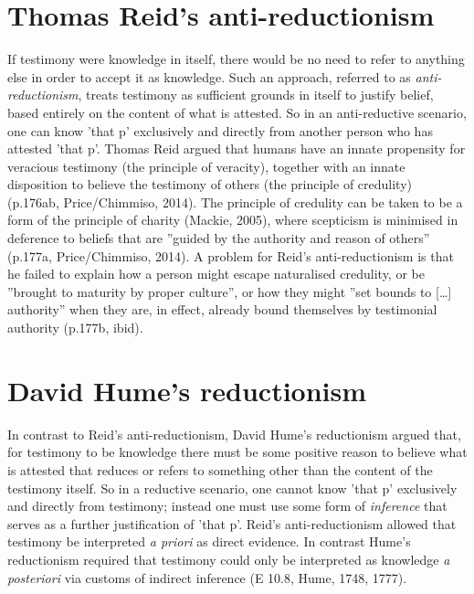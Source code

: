\documentclass[a4paper, 11pt]{article} %
\begin{document}

\section*{Thomas Reid's anti-reductionism}

If testimony were knowledge in itself, there would be no need to refer to anything else in order to accept it as knowledge. Such an approach, referred to as \textit{anti-reductionism}, treats testimony as sufficient grounds in itself to justify belief, based entirely on the content of what is attested. So in an anti-reductive scenario, one can know 'that p' exclusively and directly from another person who has attested 'that p'. Thomas Reid argued that humans have an innate propensity for veracious testimony (the principle of veracity), together with an innate disposition to believe the testimony of others (the principle of credulity) (p.176ab, Price/Chimmiso, 2014)\cite{Price/Chismisso:2014}. The principle of credulity can be taken to be a form of the principle of charity (Mackie, 2005)\cite{Mackie:2005}, where scepticism is minimised in deference to beliefs that are ''guided by the authority and reason of others'' (p.177a, Price/Chimmiso, 2014)\cite{Price/Chismisso:2014}. A problem for Reid's anti-reductionism is that he failed to explain how a person might escape naturalised credulity, or be ''brought to maturity by proper culture'', or how they might ''set bounds to [\dots] authority'' when they are, in effect, already bound themselves by testimonial authority (p.177b, ibid)\cite{Price/Chismisso:2014}.


\section*{David Hume's reductionism}

In contrast to Reid's anti-reductionism, David Hume's reductionism argued that, for testimony to be knowledge there must be some positive reason to believe what is attested that reduces or refers to something other than the content of the testimony itself. So in a reductive scenario, one cannot know 'that p' exclusively and directly from testimony; instead one must use some form of \textit{inference} that serves as a further justification of 'that p'. Reid's anti-reductionism allowed that testimony be interpreted \textit{a priori} as direct evidence. In contrast Hume's reductionism required that testimony could only be interpreted as knowledge \textit{a posteriori} via customs of indirect inference (E 10.8, Hume, 1748, 1777)\cite{Hume:1748}.
\end{document}
